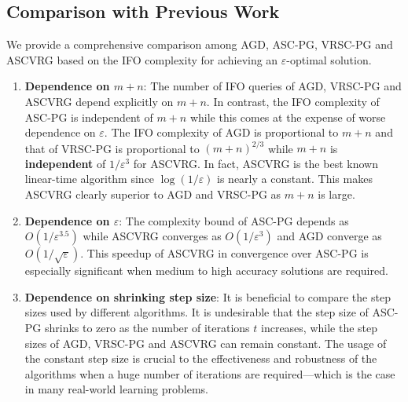 \documentclass[11pt]{article}
\begin{document}
\subsection{Comparison with Previous Work}\label{sec:discussion}
We provide a comprehensive comparison among AGD, ASC-PG, VRSC-PG and ASCVRG based on the IFO complexity for achieving an $\varepsilon$-optimal solution.
\begin{enumerate}
\item \textbf{Dependence on $m+n$}: The number of IFO queries of AGD, VRSC-PG and ASCVRG depend explicitly on $m+n$. In contrast, the IFO complexity of ASC-PG is independent of $m+n$ while this comes at the expense of worse dependence on $\varepsilon$. The IFO complexity of AGD is proportional to $m+n$ and that of VRSC-PG is proportional to $\left(m+n\right)^{2/3}$ while $m+n$ is \textbf{independent} of $1/\varepsilon^3$ for ASCVRG. In fact, ASCVRG is the best known linear-time algorithm since $\log(1/\varepsilon)$ is nearly a constant. This makes ASCVRG clearly superior to AGD and VRSC-PG as $m+n$ is large. 
\item \textbf{Dependence on $\varepsilon$}: The complexity bound of ASC-PG depends as $O(1/\varepsilon^{3.5})$ while ASCVRG converges as $O(1/\varepsilon^3)$ and AGD converge as $O(1/\sqrt{\varepsilon})$. This speedup of ASCVRG in convergence over ASC-PG is especially significant when medium to high accuracy solutions are required. 
\item \textbf{Dependence on shrinking step size}: It is beneficial to compare the step sizes used by different algorithms. It is undesirable that the step size of ASC-PG shrinks to zero as the number of iterations $t$ increases, while the step sizes of AGD, VRSC-PG and ASCVRG can remain constant. The usage of the constant step size is crucial to the effectiveness and robustness of the algorithms when a huge number of iterations are required---which is the case in many real-world learning problems.
\end{enumerate}
\end{document}
